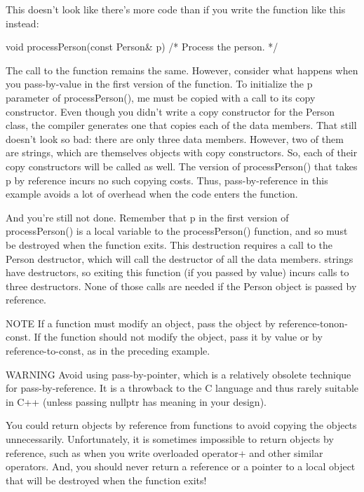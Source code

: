 This doesn’t look like there’s more code than if you write the function like this instead:

\begin{cpp}
void processPerson(const Person& p) { /* Process the person. */ }
\end{cpp}

The call to the function remains the same. However, consider what happens when you pass-by-value in the first version of the function. To initialize the p parameter of processPerson(), me must be copied with a call to its copy constructor. Even though you didn’t write a copy constructor for the Person class, the compiler generates one that copies each of the data members. That still doesn’t look so bad: there are only three data members. However, two of them are strings, which are themselves objects with copy constructors. So, each of their copy constructors will be called as well. The version of processPerson() that takes p by reference incurs no such copying costs. Thus, pass-by-reference in this example avoids a lot of overhead when the code enters the function.

And you’re still not done. Remember that p in the first version of processPerson() is a local variable to the processPerson() function, and so must be destroyed when the function exits. This destruction requires a call to the Person destructor, which will call the destructor of all the data members. strings have destructors, so exiting this function (if you passed by value) incurs calls to three destructors. None of those calls are needed if the Person object is passed by reference.

\begin{myNotic}{NOTE}
If a function must modify an object, pass the object by reference-tonon-const. If the function should not modify the object, pass it by value or by reference-to-const, as in the preceding example.
\end{myNotic}

\begin{myWarning}{WARNING}
Avoid using pass-by-pointer, which is a relatively obsolete technique for pass-by-reference. It is a throwback to the C language and thus rarely suitable in C++ (unless passing nullptr has meaning in your design).
\end{myWarning}


You could return objects by reference from functions to avoid copying the objects unnecessarily. Unfortunately, it is sometimes impossible to return objects by reference, such as when you write overloaded operator+ and other similar operators. And, you should never return a reference or a pointer to a local object that will be destroyed when the function exits!

